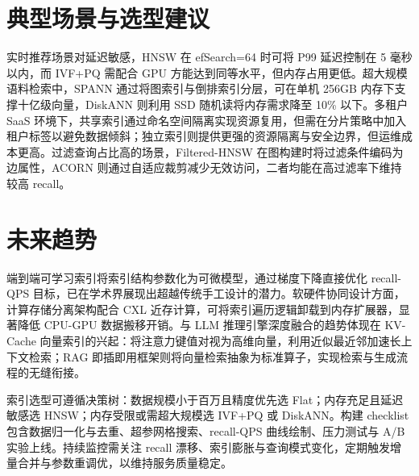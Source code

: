 \chapter{典型场景与选型建议}
实时推荐场景对延迟敏感，HNSW 在 efSearch=64 时可将 P99 延迟控制在 5 毫秒以内，而 IVF+PQ 需配合 GPU 方能达到同等水平，但内存占用更低。超大规模语料检索中，SPANN 通过将图索引与倒排索引分层，可在单机 256GB 内存下支撑十亿级向量，DiskANN 则利用 SSD 随机读将内存需求降至 10\%{} 以下。多租户 SaaS 环境下，共享索引通过命名空间隔离实现资源复用，但需在分片策略中加入租户标签以避免数据倾斜；独立索引则提供更强的资源隔离与安全边界，但运维成本更高。过滤查询占比高的场景，Filtered-HNSW 在图构建时将过滤条件编码为边属性，ACORN 则通过自适应裁剪减少无效访问，二者均能在高过滤率下维持较高 recall。\par
\chapter{未来趋势}
端到端可学习索引将索引结构参数化为可微模型，通过梯度下降直接优化 recall-QPS 目标，已在学术界展现出超越传统手工设计的潜力。软硬件协同设计方面，计算存储分离架构配合 CXL 近存计算，可将索引遍历逻辑卸载到内存扩展器，显著降低 CPU-GPU 数据搬移开销。与 LLM 推理引擎深度融合的趋势体现在 KV-Cache 向量索引的兴起：将注意力键值对视为高维向量，利用近似最近邻加速长上下文检索；RAG 即插即用框架则将向量检索抽象为标准算子，实现检索与生成流程的无缝衔接。\par
索引选型可遵循决策树：数据规模小于百万且精度优先选 Flat；内存充足且延迟敏感选 HNSW；内存受限或需超大规模选 IVF+PQ 或 DiskANN。构建 checklist 包含数据归一化与去重、超参网格搜索、recall-QPS 曲线绘制、压力测试与 A/B 实验上线。持续监控需关注 recall 漂移、索引膨胀与查询模式变化，定期触发增量合并与参数重调优，以维持服务质量稳定。\par
